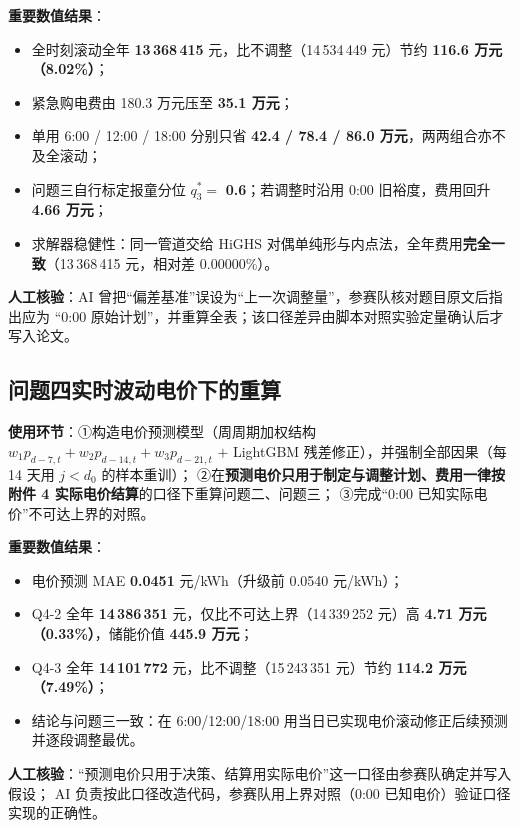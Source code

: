 \documentclass[11pt,a4paper,fontset=fandol]{ctexart}
\begin{document}
\textbf{重要数值结果}：
\begin{itemize}[itemsep=1pt]
  \item 全时刻滚动全年 \textbf{13\,368\,415} 元，比不调整（14\,534\,449 元）节约 \textbf{116.6 万元（8.02\%）}；
  \item 紧急购电费由 180.3 万元压至 \textbf{35.1 万元}；
  \item 单用 6:00 / 12:00 / 18:00 分别只省 \textbf{42.4 / 78.4 / 86.0 万元}，两两组合亦不及全滚动；
  \item 问题三自行标定报童分位 $q_3^{*}=$ \textbf{0.6}；若调整时沿用 0:00 旧裕度，费用回升 \textbf{4.66 万元}；
  \item 求解器稳健性：同一管道交给 HiGHS 对偶单纯形与内点法，全年费用\textbf{完全一致}（13\,368\,415 元，相对差 0.00000\%）。
\end{itemize}

\textbf{人工核验}：AI 曾把“偏差基准”误设为“上一次调整量”，参赛队核对题目原文后指出应为
“0:00 原始计划”，并重算全表；该口径差异由脚本对照实验定量确认后才写入论文。

\subsection*{问题四\quad 实时波动电价下的重算}

\textbf{使用环节}：①构造电价预测模型（周周期加权结构 $w_1p_{d-7,t}+w_2p_{d-14,t}+w_3p_{d-21,t}$
$+$ LightGBM 残差修正），并强制全部因果（每 14 天用 $j<d_0$ 的样本重训）；
②在\textbf{预测电价只用于制定与调整计划、费用一律按附件 4 实际电价结算}的口径下重算问题二、问题三；
③完成“0:00 已知实际电价”不可达上界的对照。

\textbf{重要数值结果}：
\begin{itemize}[itemsep=1pt]
  \item 电价预测 MAE \textbf{0.0451} 元/kWh（升级前 0.0540 元/kWh）；
  \item Q4-2 全年 \textbf{14\,386\,351} 元，仅比不可达上界（14\,339\,252 元）高
        \textbf{4.71 万元（0.33\%）}，储能价值 \textbf{445.9 万元}；
  \item Q4-3 全年 \textbf{14\,101\,772} 元，比不调整（15\,243\,351 元）节约 \textbf{114.2 万元（7.49\%）}；
  \item 结论与问题三一致：在 6:00/12:00/18:00 用当日已实现电价滚动修正后续预测并逐段调整最优。
\end{itemize}

\textbf{人工核验}：“预测电价只用于决策、结算用实际电价”这一口径由参赛队确定并写入假设；
AI 负责按此口径改造代码，参赛队用上界对照（0:00 已知电价）验证口径实现的正确性。
\end{document}
